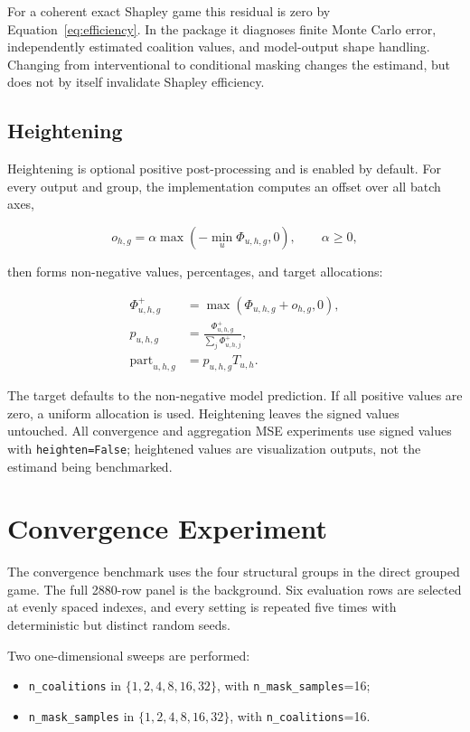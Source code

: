 \documentclass[11pt]{article}
\newcommand{\code}[1]{\texttt{#1}}
\begin{document}
For a coherent exact Shapley game this residual is zero by
Equation~\eqref{eq:efficiency}.  In the package it diagnoses finite Monte Carlo
error, independently estimated coalition values, and model-output shape
handling.  Changing from interventional to conditional masking changes the
estimand, but does not by itself invalidate Shapley efficiency.

\subsection{Heightening}

Heightening is optional positive post-processing and is enabled by default.
For every output and group, the implementation computes an offset over all
batch axes,

\begin{equation}
o_{h,g}=\alpha\max\!\left(-\min_u\Phi_{u,h,g},0\right),
\qquad \alpha\geq 0,
\end{equation}

then forms non-negative values, percentages, and target allocations:

\begin{align}
\Phi^+_{u,h,g}&=\max(\Phi_{u,h,g}+o_{h,g},0),\\
p_{u,h,g}&=\frac{\Phi^+_{u,h,g}}{\sum_j\Phi^+_{u,h,j}},\\
\mathrm{part}_{u,h,g}&=p_{u,h,g}T_{u,h}.
\end{align}

The target defaults to the non-negative model prediction.  If all positive
values are zero, a uniform allocation is used.  Heightening leaves the signed
values untouched.  All convergence and aggregation MSE experiments use signed
values with \code{heighten=False}; heightened values are visualization outputs,
not the estimand being benchmarked.

\section{Convergence Experiment}

The convergence benchmark uses the four structural groups in the direct
grouped game.  The full 2880-row panel is the background.  Six evaluation rows
are selected at evenly spaced indexes, and every setting is repeated five
times with deterministic but distinct random seeds.

Two one-dimensional sweeps are performed:

\begin{itemize}
  \item \code{n\_coalitions} in \(\{1,2,4,8,16,32\}\), with
        \code{n\_mask\_samples}=16;
  \item \code{n\_mask\_samples} in \(\{1,2,4,8,16,32\}\), with
        \code{n\_coalitions}=16.
\end{itemize}
\end{document}

